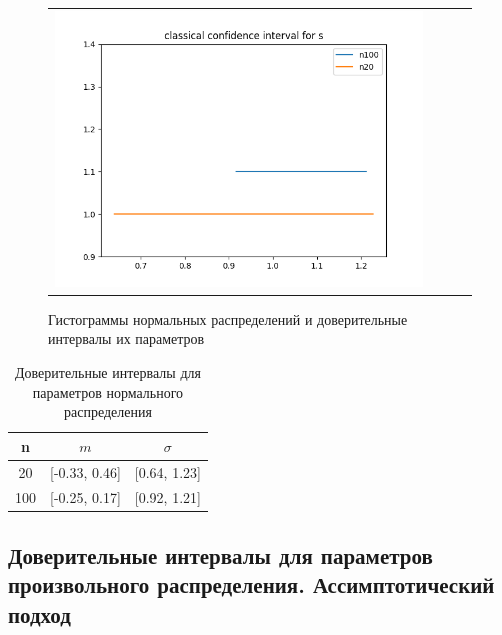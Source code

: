 \begin{figure}[H]
\begin{tabular}{cccc}
		\includegraphics[scale=0.3]{classic_s.png}
	\end{tabular}
	\caption{Гистограммы нормальных распределений и доверительные интервалы их параметров}
\end{figure}

\begin{table}[H]
	\begin{center}
		\begin{tabular}{|c|c|c|}
			\hline 
			n & $m$ & $\sigma$ \\
			\hline \hline 
			20 & [-0.33, 0.46] & [0.64, 1.23] \\
			\hline 
			100 & [-0.25, 0.17] & [0.92, 1.21] \\
			\hline
		\end{tabular}
	\end{center}
	\caption{Доверительные интервалы для параметров нормального распределения}
\end{table} 

\subsection{Доверительные интервалы для параметров произвольного распределения. Ассимптотический подход}


